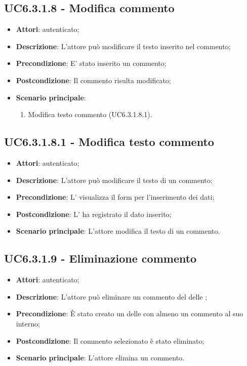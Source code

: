 \subsection{UC6.3.1.8 - Modifica commento}
\label{ssec:UC6.3.1.8}
\begin{itemize}
\item \textbf{Attori}:  autenticato;
\item \textbf{Descrizione}: L'attore può modificare il testo inserito nel commento;
\item \textbf{Precondizione}: E' stato inserito un commento;
\item \textbf{Postcondizione}: Il commento risulta modificato;
\item \textbf{Scenario principale}: \begin{enumerate}\item Modifica testo commento (UC6.3.1.8.1).
 \end{enumerate}
\end{itemize}
\subsection{UC6.3.1.8.1 - Modifica testo commento}
\label{ssec:UC6.3.1.8.1}
\begin{itemize}
\item \textbf{Attori}:  autenticato;
\item \textbf{Descrizione}: L'attore può modificare il testo di un commento;
\item \textbf{Precondizione}: L' visualizza il form per l'inserimento dei dati;
\item \textbf{Postcondizione}: L' ha registrato il dato inserito;
\item \textbf{Scenario principale}: L'attore modifica il testo di un commento.
\end{itemize}
\subsection{UC6.3.1.9 - Eliminazione commento}
\label{ssec:UC6.3.1.9}
\begin{itemize}
\item \textbf{Attori}:  autenticato;
\item \textbf{Descrizione}: L'attore può eliminare un commento del  delle ;
\item \textbf{Precondizione}: È stato creato un  delle  con almeno un commento al suo interno;
\item \textbf{Postcondizione}: Il commento selezionato è stato eliminato;
\item \textbf{Scenario principale}: L'attore elimina un commento.
\end{itemize}
